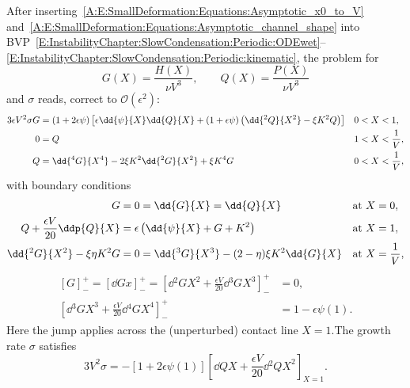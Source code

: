 \begin{subappendices}
After inserting~\eqref{A:E:SmallDeformation:Equations:Asymptotic_x0_to_V} and~\eqref{A:E:SmallDeformation:Equations:Asymptotic_channel_shape} into BVP~\eqref{E:InstabilityChapter:SlowCondensation:Periodic:ODEwet}--\eqref{E:InstabilityChapter:SlowCondensation:Periodic:kinematic}, the problem for
\begin{equation}
G(X) = \frac{H(X)}{\nu V^3}, \qquad Q(X) = \frac{P(X)}{\nu V^3}
\end{equation}
and $\sigma$ reads, correct to $\mathcal{O}\left(\epsilon^2\right)$:
\begin{align}
3\epsilon V^2 \sigma G &= \left(1 + 2\epsilon \psi\right)\left[\epsilon\dd{\psi}{X} \dd{Q}{X} + \left(1 + \epsilon \psi\right)\left(\dd{^2 Q}{X^2} -\param K^2 Q\right)\right] & &0 < X < 1,\label{A:E:Chapter6:SmallDef:BVP:ODEwet}\\
0 &= Q & &1 < X < \frac{1}{V},\label{A:E:Chapter6:SmallDef:BVP:ODEdry}\\
Q &= \dd{^4 G}{X^4} - 2\param K^2 \dd{^2 G}{X^2} +\param K^4 G & &0 < X<\frac{1}{V},\label{A:E:Chapter6:state_BVP:pressure2shape}
\end{align}
with boundary conditions
\begin{align}
G &= 0 = \dd{G}{X} = \dd{Q}{X} & &\text{at}~X = 0,\label{A:E:Chapter6:SmallDef:BVP:BC_at_0}\\
Q + \frac{\epsilon V}{20}\ddp{Q}{X} &= \epsilon\left(\dd{\psi}{X} + G + K^2\right)  & &\text{at}~X= 1,\label{A:E:Chapter6:SmallDef:BVP:pressure_bc}\\
\dd{^2 G}{X^2} -\param \poisson K^2 G &= 0 = \dd{^3 G}{X^3} - (2-\poisson)\param K^2 \dd{G}{X} & &\text{at}~X = \frac{1}{V},\label{A:E:Chapter6:SmallDef:BVP:BC_at_1}
\end{align}
\begin{align}\label{A:E:Chapter6:SmallDef:BVP:jump_conds}
\left[G\right]_-^+= \left[\dd{G}{x}\right]_-^+ = \left[\dd{^2G}{X^2} + \frac{\epsilon V}{20}\dd{^3 G}{X^3}\right]_-^+&= 0, \\
\left[\dd{^3 G}{X^3} + \frac{\epsilon V}{20}\dd{^4 G}{X^4}\right]_-^+ &= 1 - \epsilon \psi(1).
\end{align}
Here the jump applies across the (unperturbed) contact line $X = 1$.The growth rate $\sigma$ satisfies
\begin{equation}\label{A:E:Chapter6:SmallDef:BVP:kinematic}
3V^2\sigma = -\left[1 + 2\epsilon \psi(1)\right]\left[\dd{Q}{X} + \frac{\epsilon V}{20}\dd{^2 Q}{X^2}\right]_{X = 1}.
\end{equation}


\end{subappendices}
